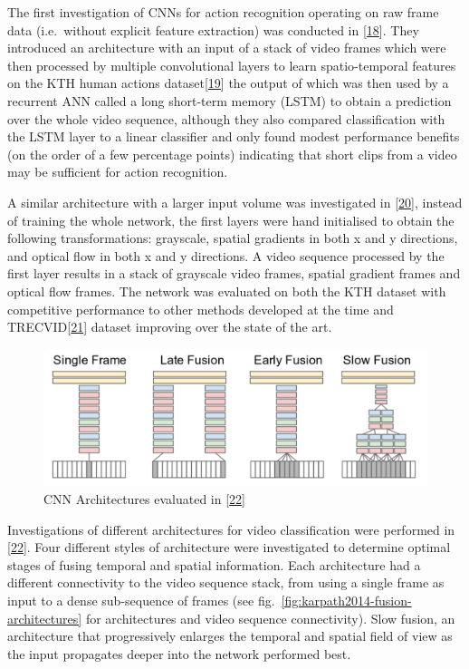 \documentclass[A4paper,draft]{scrreprt}
\begin{document}
The first investigation of CNNs for action recognition operating on raw
frame data (i.e.~without explicit feature extraction) was conducted in
{[}\protect\hyperlink{ref-baccouche2011_SequentialDeepLearning}{18}{]}.
They introduced an architecture with an input of a stack of video frames
which were then processed by multiple convolutional layers to learn
spatio-temporal features on the KTH human actions
dataset{[}\protect\hyperlink{ref-schuldt2004_Recognizinghumanactions}{19}{]}
the output of which was then used by a recurrent ANN called a long
short-term memory (LSTM) to obtain a prediction over the whole video
sequence, although they also compared classification with the LSTM layer
to a linear classifier and only found modest performance benefits (on
the order of a few percentage points) indicating that short clips from a
video may be sufficient for action recognition.

A similar architecture with a larger input volume was investigated in
{[}\protect\hyperlink{ref-ji2013_3DConvolutionalNeural}{20}{]}, instead
of training the whole network, the first layers were hand initialised to
obtain the following transformations: grayscale, spatial gradients in
both x and y directions, and optical flow in both x and y directions. A
video sequence processed by the first layer results in a stack of
grayscale video frames, spatial gradient frames and optical flow frames.
The network was evaluated on both the KTH dataset with competitive
performance to other methods developed at the time and
TRECVID{[}\protect\hyperlink{ref-_TRECVIDData}{21}{]} dataset improving
over the state of the art.

\begin{figure}
\centering
\includegraphics{media/images/karpathy2014-fusion-architectures.png}
\caption{CNN Architectures evaluated in
{[}\protect\hyperlink{ref-karpathy2014_LargeScaleVideoClassification}{22}{]}}\label{fig:karpathy2014-fusion-architectures}
\end{figure}

Investigations of different architectures for video classification were
performed in
{[}\protect\hyperlink{ref-karpathy2014_LargeScaleVideoClassification}{22}{]}.
Four different styles of architecture were investigated to determine
optimal stages of fusing temporal and spatial information. Each
architecture had a different connectivity to the video sequence stack,
from using a single frame as input to a dense sub-sequence of frames
(see fig.~\ref{fig:karpath2014-fusion-architectures} for architectures
and video sequence connectivity). Slow fusion, an architecture that
progressively enlarges the temporal and spatial field of view as the
input propagates deeper into the network performed best.
\end{document}
